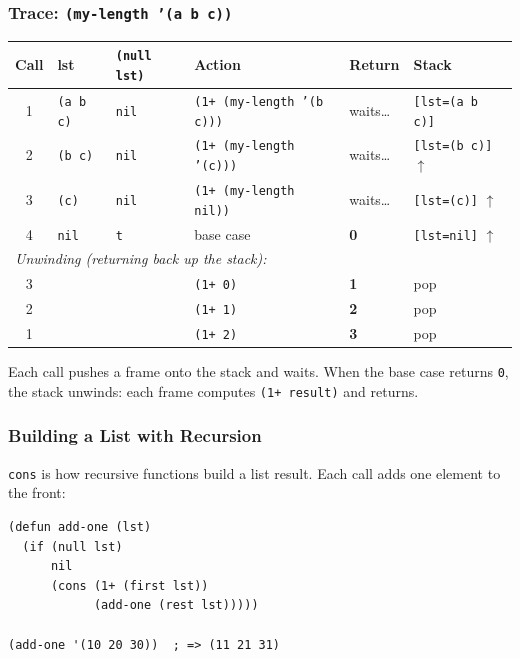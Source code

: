 \subsubsection{Trace: \texttt{(my-length '(a b c))}}

\begin{center}
\begin{tabular}{clllll}
  \toprule
  \textbf{Call} & \textbf{lst} & \texttt{(null lst)} &
  \textbf{Action} & \textbf{Return} & \textbf{Stack} \\
  \midrule
  1 & \texttt{(a b c)} & \texttt{nil} &
    \texttt{(1+ (my-length '(b c)))} & waits\ldots &
    \texttt{[lst=(a b c)]} \\
  2 & \texttt{(b c)} & \texttt{nil} &
    \texttt{(1+ (my-length '(c)))} & waits\ldots &
    \texttt{[lst=(b c)]} $\uparrow$ \\
  3 & \texttt{(c)} & \texttt{nil} &
    \texttt{(1+ (my-length nil))} & waits\ldots &
    \texttt{[lst=(c)]} $\uparrow$ \\
  4 & \texttt{nil} & \texttt{t} &
    base case & \textbf{0} &
    \texttt{[lst=nil]} $\uparrow$ \\
  \midrule
  \multicolumn{6}{l}{\textit{Unwinding (returning back up the stack):}} \\
  \midrule
  3 & & & \texttt{(1+ 0)} & \textbf{1} & pop \\
  2 & & & \texttt{(1+ 1)} & \textbf{2} & pop \\
  1 & & & \texttt{(1+ 2)} & \textbf{3} & pop \\
  \bottomrule
\end{tabular}
\end{center}

Each call pushes a frame onto the stack and waits.
When the base case returns \texttt{0}, the stack unwinds:
each frame computes \texttt{(1+ result)} and returns.

\subsubsection{Building a List with Recursion}

\texttt{cons} is how recursive functions build a list result.
Each call adds one element to the front:

\begin{lstlisting}
(defun add-one (lst)
  (if (null lst)
      nil
      (cons (1+ (first lst))
            (add-one (rest lst)))))

(add-one '(10 20 30))  ; => (11 21 31)
\end{lstlisting}

